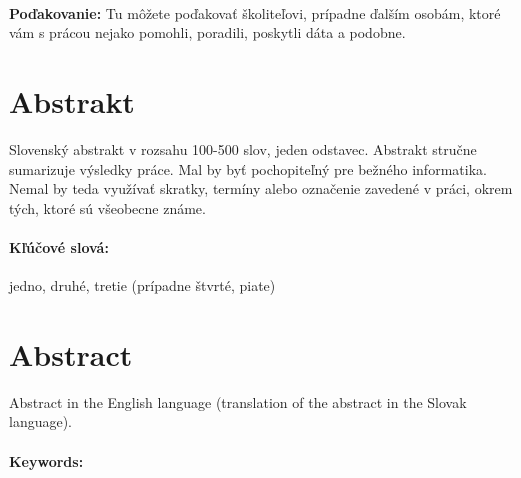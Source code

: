 \documentclass[12pt, twoside]{book}
\begin{document}


\newpage 
\pagestyle{plain}
~

\vfill
{\bf Poďakovanie:} Tu môžete poďakovať školiteľovi, prípadne
ďalším osobám, ktoré vám s prácou nejako pomohli, poradili,
poskytli dáta a podobne.


\newpage 
\section*{Abstrakt}


Slovenský abstrakt v rozsahu 100-500 slov, jeden odstavec. Abstrakt
stručne sumarizuje výsledky práce. Mal by byť pochopiteľný pre bežného
informatika. Nemal by teda využívať skratky, termíny alebo označenie
zavedené v práci, okrem tých, ktoré sú všeobecne známe.

\paragraph*{Kľúčové slová:} jedno, druhé, tretie (prípadne štvrté, piate)


\newpage 
\section*{Abstract}

Abstract in the English language (translation of the abstract in the
Slovak language).


\paragraph*{Keywords:} 


%
%
%
\end{document}
